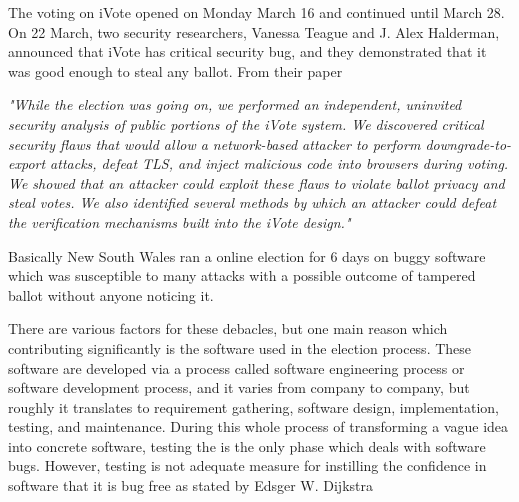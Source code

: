  \noindent
  The voting on iVote 
  opened on Monday March 16 and continued until March 28. On 22 March,
  two security researchers, Vanessa Teague and J. Alex Halderman, 
  announced that iVote has critical security bug, and they demonstrated 
  that it was good enough to steal any ballot. From their paper
  \citep{10.1007/978-3-319-22270-7_3}
  
  \textit{ 
  "While the election was going on, we performed an independent,
   uninvited security analysis of public portions of the iVote 
   system. We discovered critical security flaws that would allow
   a network-based attacker to perform downgrade-to-export 
   attacks, defeat TLS, and inject malicious code 
   into browsers during voting. We showed that an attacker could
   exploit these flaws to violate ballot privacy and steal votes. 
   We also identified several methods by which an attacker could
   defeat the verification mechanisms built into the iVote design." }
  
  \noindent
  Basically New South Wales ran a online election for 6 days on 
  buggy software which was susceptible to many attacks with a possible 
  outcome of tampered ballot without anyone noticing it. 
%  
%   
   
   There are various factors for these debacles, but one main reason 
   which contributing significantly  is the software used in the election process. 
   These software are developed via a process called software engineering process 
   or software development process, and it varies from company to company, 
   but  roughly it translates to  requirement 
   gathering, software design, implementation, testing, and maintenance. 
   During this whole process of transforming a vague idea into 
   concrete software, testing the is the only phase which deals 
   with software bugs. However, testing is not adequate measure
   for instilling the confidence in software that it is bug free 
   as stated by Edsger W. Dijkstra 
   
